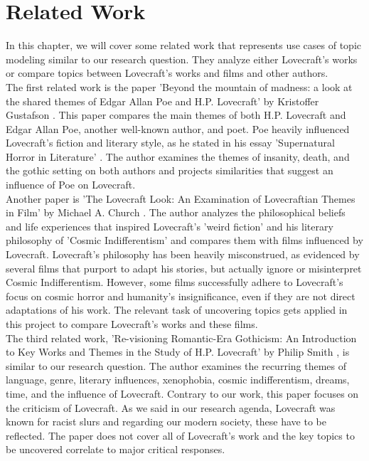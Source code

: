 \section{Related Work}

In this chapter, we will cover some related work that represents use cases of topic modeling 
similar to our research question. They analyze either Lovecraft's works or compare topics 
between Lovecraft's works and films and other authors.\\

The first related work is the paper 'Beyond the mountain of madness: a look at the shared 
themes of Edgar Allan Poe and H.P. Lovecraft' by Kristoffer Gustafson \cite{gusta}. This paper compares 
the main themes of both H.P. Lovecraft and Edgar Allan Poe, another well-known author, and 
poet. Poe heavily influenced Lovecraft's fiction and literary style, as he stated in his essay 
'Supernatural Horror in Literature' \cite{wiki2}. The author examines the themes of insanity, death, and the 
gothic setting on both authors and projects similarities that suggest an influence of Poe on 
Lovecraft.\\

Another paper is 'The Lovecraft Look: An Examination of Lovecraftian Themes in Film' by 
Michael A. Church \cite{church}. The author analyzes the philosophical beliefs and life experiences that 
inspired Lovecraft's 'weird fiction' and his literary philosophy of 'Cosmic Indifferentism' 
and compares them with films influenced by Lovecraft. Lovecraft's philosophy has been heavily 
misconstrued, as evidenced by several films that purport to adapt his stories, but actually 
ignore or misinterpret Cosmic Indifferentism. However, some films successfully adhere to 
Lovecraft's focus on cosmic horror and humanity's insignificance, even if they are not direct 
adaptations of his work. The relevant task of uncovering topics gets applied in this project 
to compare Lovecraft's works and these films.\\

The third related work, 'Re-visioning Romantic-Era Gothicism: An Introduction to Key Works 
and Themes in the Study of H.P. Lovecraft' by Philip Smith \cite{smith}, is similar to our research 
question. The author examines the recurring themes of language, genre, literary influences, 
xenophobia, cosmic indifferentism, dreams, time, and the influence of Lovecraft. Contrary 
to our work, this paper focuses on the criticism of Lovecraft. As we said in our research 
agenda, Lovecraft was known for racist slurs and regarding our modern society, these have 
to be reflected. The paper does not cover all of Lovecraft's work and the key topics to be 
uncovered correlate to major critical responses.